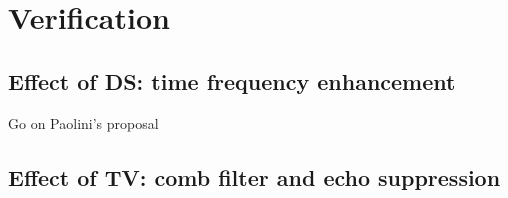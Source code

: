 \section{Verification}

\subsection{Effect of DS: time frequency enhancement}

Go on Paolini's proposal

\subsection{Effect of TV: comb filter and echo suppression}







